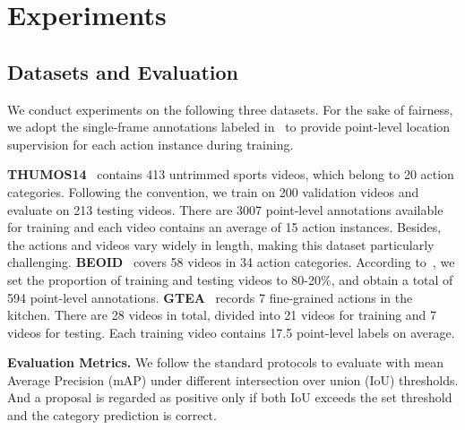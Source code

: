 \documentclass[final]{cvpr}
\begin{document}
\section{Experiments}
\subsection{Datasets and Evaluation}
We conduct experiments on the following three datasets. For the sake of fairness, we adopt the single-frame annotations labeled in~\cite{ma2020sf} to provide point-level location supervision for each action instance during training.




\textbf{THUMOS14}~\cite{jiang2014thumos} contains 413 untrimmed sports videos, which belong to 20 action categories. Following the convention, we train on 200 validation videos and evaluate on 213 testing videos. There are 3007 point-level annotations available for training and each video contains an average of 15 action instances. Besides, the actions and videos vary widely in length, making this dataset particularly challenging.
\textbf{BEOID}~\cite{damen2014you} covers 58 videos in 34 action categories. According to~\cite{ma2020sf,moltisanti2019action}, we set the proportion of training and testing videos to 80-20\%, and obtain a total of 594 point-level annotations.
\textbf{GTEA}~\cite{lei2018temporal} records 7 fine-grained actions in the kitchen. There are 28 videos in total, divided into 21 videos for training and 7 videos for testing. Each training video contains 17.5 point-level labels on average.




\textbf{Evaluation Metrics.}
We follow the standard protocols to evaluate with mean Average Precision (mAP) under different intersection over union (IoU) thresholds. And a proposal is regarded as positive only if both IoU exceeds the set threshold and the category prediction is correct.
\end{document}

